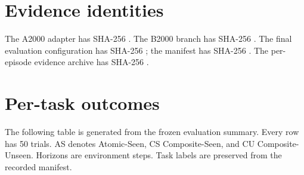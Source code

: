 \documentclass[10pt,twocolumn,letterpaper]{article}
\begin{document}
\clearpage\onecolumn\appendix

\section{Evidence identities}

The A2000 adapter has SHA-256 . The B2000 branch has SHA-256 . The final evaluation configuration has SHA-256 ; the manifest has SHA-256 . The per-episode evidence archive has SHA-256 .


\section{Per-task outcomes}

The following table is generated from the frozen evaluation summary. Every row has 50 trials. AS denotes Atomic-Seen, CS Composite-Seen, and CU Composite-Unseen. Horizons are environment steps. Task labels are preserved from the recorded manifest.
\end{document}
